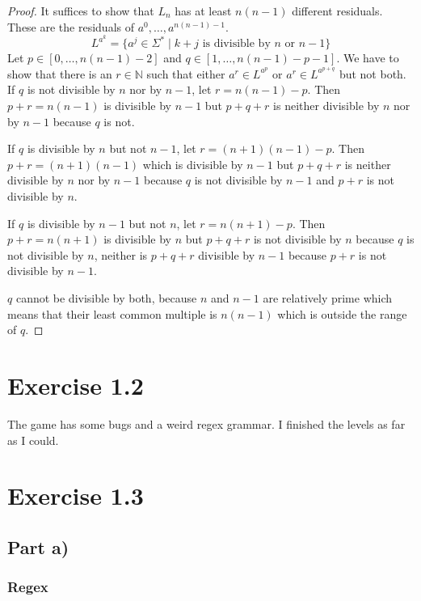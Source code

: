 \documentclass[10pt,a4paper]{article}
\begin{document}
\begin{proof}
  It suffices to show that $L_{n}$ has at least $n(n - 1)$ different residuals.
  These are the residuals of $a^{0}, \dots, a^{n(n - 1) - 1}$.
  \begin{equation*}
    L^{a^{k}} = \{ a^{j} \in \Sigma^{*} \mid k + j \text{ is divisible by $n$ or $n - 1$} \}
  \end{equation*}
  Let $p \in [0, \dots, n(n - 1) - 2]$ and $q \in [1, \dots, n(n - 1) - p - 1]$.
  We have to show that there is an $r \in \mathbb{N}$ such that either $a^{r} \in L^{a^{p}}$ or $a^{r} \in L^{a^{p + q}}$ but not both.
  If $q$ is not divisible by $n$ nor by $n - 1$, let $r = n(n - 1) - p$.
  Then $p + r = n(n - 1)$ is divisible by $n - 1$ but $p + q + r$ is neither divisible by $n$ nor by $n - 1$ because $q$ is not.

  If $q$ is divisible by $n$ but not $n - 1$, let $r = (n + 1)(n - 1) - p$.
  Then $p + r = (n + 1)(n - 1)$ which is divisible by $n - 1$ but $p + q + r$ is neither divisible by $n$ nor by $n - 1$ because $q$ is not divisible by $n - 1$ and $p + r$ is not divisible by $n$.

  If $q$ is divisible by $n - 1$ but not $n$, let $r = n(n + 1) - p$.
  Then $p + r = n(n + 1)$ is divisible by $n$ but $p + q + r$ is not divisible by $n$ because $q$ is not divisible by $n$, neither is $p + q + r$ divisible by $n - 1$ because $p + r$ is not divisible by $n - 1$.

  $q$ cannot be divisible by both, because $n$ and $n - 1$ are relatively prime which means that their least common multiple is $n(n - 1)$ which is outside the range of $q$.
\end{proof}

\section*{Exercise 1.2}

The game has some bugs and a weird regex grammar.
I finished the levels as far as I could.

\section*{Exercise 1.3}

\subsection*{Part a)}

\subsubsection*{Regex}
\end{document}
